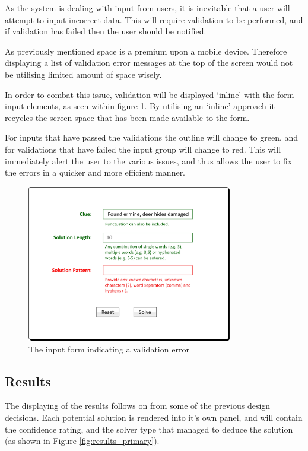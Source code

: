 As the system is dealing with input from users, it is inevitable that a user 
will attempt to input incorrect data. This will require validation to be 
performed, and if validation has failed then the user should be notified. 

As previously mentioned space is a premium upon a mobile device. Therefore 
displaying a list of validation error messages at the top of the screen would 
not be utilising limited amount of space wisely.

In order to combat this issue, validation will be displayed `inline' with the 
form input elements, as seen within figure \ref{fig:input_form_error}. By 
utilising an `inline' approach it recycles the screen space that has been made 
available to the form.

For inputs that have passed the validations the outline will change to green, 
and for validations that have failed the input group will change to red. This 
will immediately alert the user to the various issues, and thus allows the user 
to fix the errors in a quicker and more efficient manner.

\begin{figure}[H]
  \centering
  \includegraphics[width=0.8\textwidth]{ui/form_error.jpg}
  \caption{The input form indicating a validation error}
  \label{fig:input_form_error}
\end{figure}


\subsection{Results} 
\label{sub:results}

The displaying of the results follows on from some of the previous design 
decisions. Each potential solution is rendered into it's own panel, and will 
contain the confidence rating, and the solver type that managed to deduce the 
solution (as shown in Figure \ref{fig:results_primary}).

